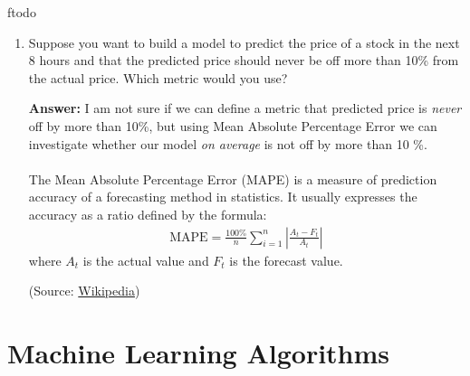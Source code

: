 ƒtodo\documentclass{article}
\newenvironment{QandA}{\begin{enumerate}[label=\arabic*.]}{\end{enumerate}}
\newenvironment{answer}{\par\normalfont \textbf{Answer:}}{}
\begin{document}
\begin{QandA}
    \item Suppose you want to build a model to predict the price of a stock in the next 8 hours and that the predicted price should never be off more than 10\% from the actual price. Which metric would you use?
    \begin{answer}
        I am not sure if we can define a metric that predicted price is \textit{never} off by more than 10\%, but using Mean Absolute Percentage Error we can investigate whether our model \textit{on average} is not off by more than 10 \%. \\\\
        The Mean Absolute Percentage Error (MAPE) is a measure of prediction accuracy of a forecasting method in statistics. It usually expresses the accuracy as a ratio defined by the formula:
        \begin{align*}
            \text{MAPE} = \frac{100\%}{n} \sum_{i=1}^n \left \vert  \frac{A_t - F_t}{A_t} \right \vert
        \end{align*}
        where $A_t$ is the actual value and $F_t$ is the forecast value.

        (Source: \href{https://en.wikipedia.org/wiki/Mean_absolute_percentage_error}{Wikipedia})
    \end{answer}
\end{QandA}

\section{Machine Learning Algorithms}
\end{document}
